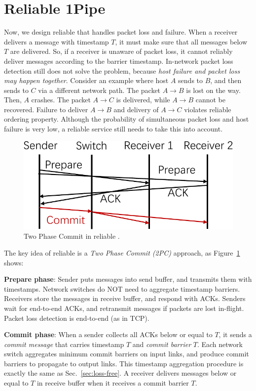 \section{Reliable 1Pipe}
\label{sec:reliable}

Now, we design reliable \sys{} that handles packet loss and failure.
When a receiver delivers a message with timestamp $T$, it must make sure that all messages below $T$ are delivered.
So, if a receiver is unaware of packet loss, it cannot reliably deliver messages according to the barrier timestamp.
In-network packet loss detection still does not solve the problem, because \emph{host failure and packet loss may happen together}.
Consider an example where host $A$ sends to $B$, and then sends to $C$ via a different network path. The packet $A \rightarrow B$ is lost on the way. Then, $A$ crashes. The packet $A \rightarrow C$ is delivered, while $A \rightarrow B$ cannot be recovered. Failure to deliver $A \rightarrow B$ and delivery of $A \rightarrow C$ violates reliable ordering property.
Although the probability of simultaneous packet loss and host failure is very low, a reliable service still needs to take this into account.


\begin{figure}[t]
\centering
	\includegraphics[width=.3\textwidth]{images/2PC.pdf}
	\caption{Two Phase Commit in reliable \sys{}.}
	\label{fig:2PC}
\end{figure}

The key idea of reliable \sys{} is a \emph{Two Phase Commit (2PC)} approach, as Figure~\ref{fig:2PC} shows:

\begin{ecompact}
\item \textbf{Prepare phase}: Sender puts messages into send buffer, and transmits them with timestamps. Network switches do NOT need to aggregate timestamp barriers. Receivers store the messages in receive buffer, and respond with ACKs. Senders wait for end-to-end ACKs, and retransmit messages if packets are lost in-flight. Packet loss detection is end-to-end (as in TCP).
\item \textbf{Commit phase}: When a sender collects all ACKs below or equal to $T$, it sends a \emph{commit message} that carries timestamp $T$ and \emph{commit barrier} $T$. Each network switch aggregates minimum commit barriers on input links, and produce commit barriers to propagate to output links. This timestamp aggregation procedure is exactly the same as Sec.~\ref{sec:loss-free}. A receiver delivers messages below or equal to $T$ in receive buffer when it receives a commit barrier $T$.
\end{ecompact}




